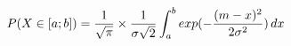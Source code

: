 \documentclass[preview]{standalone}
\begin{document}
\begin{align*}
P( X \in [a;b] ) = { \frac{1}{\sqrt{\pi}} } \times { \frac{1}{\sigma \sqrt{2}} } \int_a^b { exp(-{ {(m - x)^2} \over {2 \sigma^2} }) } \, dx
\end{align*}
\end{document}
